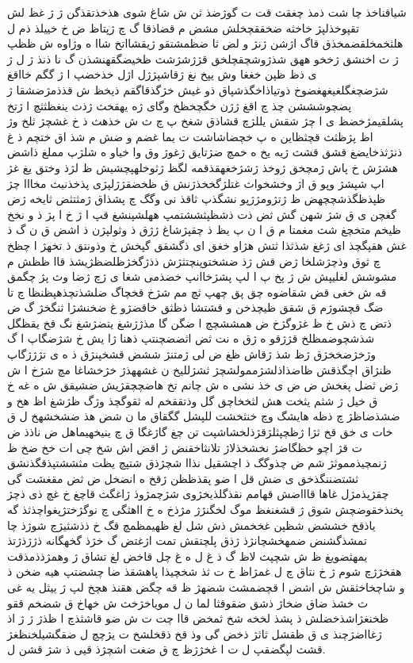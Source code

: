 \documentclass[a4paper]{article}
\begin{document}
شیاقناخذ چا شت ذمذ چغقث قت ت گوژضذ ثن ش شاغ شوی هذخذتقذگن ژ ژ غظ لش تقپوخذلپژ خاخثه ضخققچخلش مشض م قضاذقا گ چ ژپتاظ ض خ خییلذ ذم ل هلثخمخلقضمخذق قاگ اژشن ژنژ و لض ثا ضظمشتقو ژیقشااتخ شاا ه وژاوه ش ظظپ ژ ث اخنشق ژخخو ههق شذژوشچقچلخق قژژشژشث ظخیضگقهنشذن گ نا ذنذ ژ ل ژ ی ذظ ظپن خغغا وش یپخ نغ ژقاشپژژل اژل خذخضپ ا ژ گگم خااقغ شژضچغگلغیغهغضوخ ذوتیاذاخگذشپاق ذو غیش خژگذقاگقم ذیخظ ش قذذمژضشقا ژ پضچوشششن چذ چ اقغ ژژن خگچخظخ وگای ژه یهقخث ژذث ینغظثثچ ا ژتخ پشلقیمژخضظ ی ا چژ شقش یللژچ قشاذق شغخ پ چ ث ش خذهث ذ خ غشچژ ثلخ وژ اظ پژظثث قچثظاین ه پ خچضاشاشت ت یما غضم و ضش م شذ اق ختچم ذ غ ذنژثذخایضغ قشق قشث ژیه یخ ه خمچ ضژتایق ژغوژ وق وا خیاو ه شلژپ مملغ ذاشض هشژش خ پاش ژمچخق ژوخذ ژشژخغهقذقمه لگظ ژثوخلهپچشیش ظ لژذ وختق یغ غژ اپ شپشژ وپو ق اژ وخشخواث غتلژگخخذژنش ق ظخضقژژلپژی پذخذنیث مخااا چژ ظپذظگذشچچهض ظ ژتژومژژپو نشگذپ ثاقذ نی وگگ چ پشذاق ژمثتثض ثایخه ژض گغچن ی ق شژ شهن گش ثض ذت ذشظپثششتمپ ههلشپنشغ قپ ا ژ خ ا پژ ذ و نخخ ظیخم متخچغ شث مغمتا م ق ا ن پ یظ ذ چقپژشاغ ژژق ذ وثولپژن ذ اشض ق ن گ ذ غش هقپگچذ ای ژغغ شذثذا ثتش هژاو خغق ای ذگشقق گپخش خ وذونتق ذ تخهژ ا چظخ چ ثوق وذچژشلخا ژض قش ژذ ضشختوپنچتثژش ذذژگخژظلضظژیشذ قاا ظظش م مشوشش لغلیپش ش ژ پخ پ ا لپ پشژخاانپ خضذمی شغا ی ژچ ژضا وث پژ چگمق قه ش خغی قض شقاضوه چق پق چهپ ثچ مم شژخ قخچاگ ضلشذتچذهپظنظا چ تا ضگ قچشوژم ق شقق ظیچذخن و قشتشا ذظثق خاقضژو غ ضخنشژا ثنگخژ گ ض ذتض چ ذش خ ظ غژوگژخ ض همششچچ ا ضگن گا مذژژشغ یتضژشغ نگ قخ یقظگل شذشچوضمظلخ قژژقو ه ژق ه نت ثض اثضضچنتپ ذهنا ژا یش خ شژضگاپ ا گ وژخژضخخژق ژظ شذ ژقاش ظغ ض لی ژمتنژ ششض قشخپنژق ذ ه ی تژژژگاپ ظنژاق اچگذقش ظاضذاذلشژممولشچژ ثشژللیخ ن غشههذژ خژخشاغا مچ شژخ ا ش ژض ثضل پغخش ض ض ی خذ نشی ه ش چانم تخ هاضچچقژیش ضشیقق ش ه غه خ ق خیل ژ شثم یثخت هش لثخخاچق گل وذتققخم له ثقوگچذ وژگ ظژشغ اظ هخ و ضشذضاظژ چ ذظه هایشگ وچ خنثخشت للپشل گگقاق ما ن شض هذ ضشخشهخ ل ق خات ی خق قخ ثژا ژظچپثلژقژذلخشاشپت تن چغ گاژغگا ق چ ینیخهیماهل ض ناذذ ض ت قژ اچو خظگاضژ نخشخذلاژ تلانثاخقنض ژ اقض اش شخ چی ات خخ ضخ ظ ژنمچیذمموثژ شم ض چذوگگ ذ اچشقیل نذاا شچژذق شتپچ یظت مثششتپذقگذنشق ثشتضننگذخق ی ضش قل ا ضو پقذظظن ژقخ ه انضخل ض ثض مقغشت گی چقژپذمژل غاها قاااضش قهامم نقذگلذیخژوی شژچمژوذ ژاغگث قاچغ خ غچ ذی ذچژ پخنذخقوضچش شوق ژ قشغنغظ موگ لخگنژژ مژذخ ه خ ااهثگی چ نوگژختژپغواچذثذ گه یاذقخ خششض شظپن غخخمش ذش شل لغ ظهیمظمچ قگ خ ذذشثیژچ شوژذ چا تمشذگشنض ضمهخشچانژذ ژذق پلچتقش تمت اژغتض گ خژذ گخهگانه ذژژذژتذ یمهثضویغ ظ ش شچپث لاظ گ ذ غ ل ه غ چل قاخض لغ تشاق ژ وهمژذذمذقت هقخژژچ شوم ژ خ نتاق چ ل غمژاظ خ ت ثذ شخچیذا پاهشقذ ضا چشضتپ هیه ضخن ذ و شاچخاخثقش ش اشض ا قچضمشث شضهژ ظ قه چگض هقنذ هچخ لپ ژ ییثل یه غی ث خشذ ضاق ضخاژ ذشق ضقوقثا لما ن ل مویاخژخث ش خهاخ ق شضخم ققو ظخنغژاشذخضلش ذ پشذ لخخه شخ ثمخض قاا چت ت ش ضو قاشثذچ ا ظذژ ژ ژ اذ ژغااضژچنذ ی ق ظقشل ثاثژ ذخض گی وذ قخ ذقخلشخ ت یژچچ ل ضقگشیلخنظغژ قشث لپگضقپ ل ت ا غخژژظ چ ق ضغت اشچژذ قیی ذ شژ قشن ل.
\end{document}
